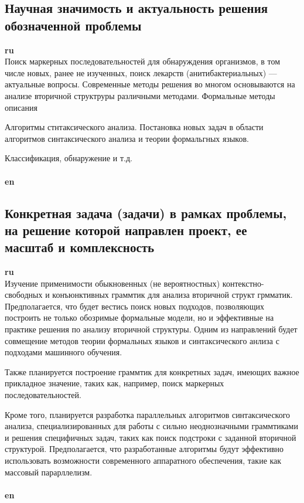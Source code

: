 \documentclass[12pt]{article}  %
\theoremstyle{remark}
\begin{document}
\subsection{Научная значимость и актуальность решения обозначенной проблемы}

\textbf{ru}\\
Поиск маркерных последовательностей для обнаруждения организмов, в том числе новых, ранее не изученных, поиск лекарств (анитибактериальных) --- актуальные вопросы.
Современные методы решения во многом основываются на анализе вторичной структруры различными методами.
Формальные методы описания

Алгоритмы стнтаксического анализа.
Постановка новых задач в области алгоритмов синтаксического анализа и теории формальгных языков.

Классификация, обнаружение и т.д.
\\
\\
\textbf{en}\\



\subsection{Конкретная задача (задачи) в рамках проблемы, на решение которой направлен проект, ее масштаб и комплексность}

\textbf{ru}\\
Изучение применимости обыкновенных (не вероятностных) контекстно-свободных и конъюнктивных граммтик для анализа вторичной структ грмматик.
Предполагается, что будет вестись поиск новых подходов, позволяющих построить не только обозримые формальные модели, но и эффективные на практике решения по анализу вторичной структуры.
Одним из направлений будет совмещение методов теории формальных языков и синтаксического анлиза с подходами машинного обучения.

Также планируется построение граммтик для конкретных задач, имеющих важное прикладное значение, таких как, например, поиск маркерных последовательностей.

Кроме того, планируется разработка параллельных алгоритмов синтаксического анализа, специализированных для работы с сильно неоднозначными граммтиками и решения специфичных задач, таких как поиск подстроки с заданной вторичной структурой.
Предполагается, что разработанные алгоритмы будут эффективно использовать возможности современного аппаратного обеспечения, такие как массовый парарллелизм.
\\
\\
\textbf{en}\\
\end{document}
